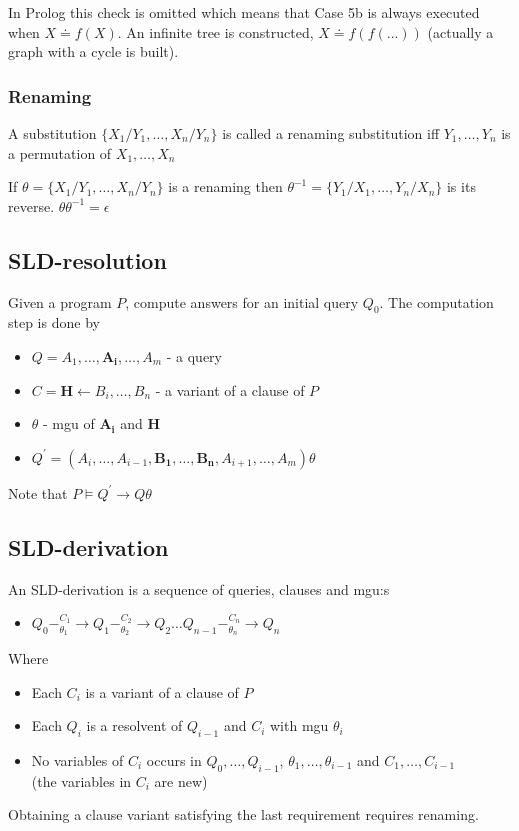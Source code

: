 \documentclass{article}
\begin{document}
In Prolog this check is omitted which means that Case 5b is always executed when $X\doteq f(X)$. An infinite tree is constructed, $X\doteq f(f(...))$ (actually a graph with a cycle is built).

\subsubsection{Renaming}
A substitution $\{X_1/Y_1,\ldots,X_n/Y_n\}$ is called a renaming substitution iff $Y_1,\ldots,Y_n$ is a permutation of $X_1,\ldots,X_n$

If $\theta=\{X_1/Y_1,\ldots,X_n/Y_n\}$ is a renaming then $\theta^{-1}=\{Y_1/X_1,\ldots,Y_n/X_n\}$ is its reverse. $\theta\theta^{-1}=\epsilon$

\subsection{SLD-resolution}
Given a program $P$, compute answers for an initial query $Q_0$.
The computation step is done by
\begin{itemize}
    \item $Q = A_1,\ldots,\boldsymbol{A_i},\ldots,A_m$ - a query
    \item $C = \boldsymbol{H}\leftarrow B_i,\ldots,B_n$ - a variant of a clause of $P$
    \item $\theta$ - mgu of $\boldsymbol{A_i}$ and $\boldsymbol{H}$
    \\
    \item $Q^\prime=(A_i,\ldots,A_{i-1},\boldsymbol{B_1,\ldots,B_n},A_{i+1},\ldots,A_m)\theta$
\end{itemize}
Note that $P\models Q^\prime \rightarrow Q\theta$

\subsection{SLD-derivation}
An SLD-derivation is a sequence of queries, clauses and mgu:s
\begin{itemize}
    \item $Q_0-_{\theta_1}^{C_1}\rightarrow Q_1-_{\theta_2}^{C_2}\rightarrow Q_2\ldots Q_{n-1}-_{\theta_n}^{C_n}\rightarrow Q_n$
\end{itemize}
Where
\begin{itemize}
    \item Each $C_i$ is a variant of a clause of $P$
    \item Each $Q_i$ is a resolvent of $Q_{i-1}$ and $C_i$ with mgu $\theta_i$
    \item No variables of $C_i$ occurs in $Q_0,\ldots,Q_{i-1}$, $\theta_1,\ldots,\theta_{i-1}$ and $C_1,\ldots,C_{i-1}$ 
    \\(the variables in $C_i$ are new)
\end{itemize}
Obtaining a clause variant satisfying the last requirement requires renaming.
\end{document}
